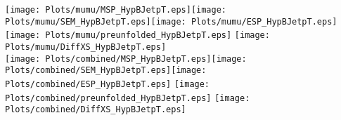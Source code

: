 \documentclass[a4paper,10pt]{article}
\begin{document}
\texttt{[image: Plots/mumu/MSP\_HypBJetpT.eps]}\texttt{[image: Plots/mumu/SEM\_HypBJetpT.eps]}\texttt{[image: Plots/mumu/ESP\_HypBJetpT.eps]} \texttt{[image: Plots/mumu/preunfolded\_HypBJetpT.eps]} \texttt{[image: Plots/mumu/DiffXS\_HypBJetpT.eps]}\\
\texttt{[image: Plots/combined/MSP\_HypBJetpT.eps]}\texttt{[image: Plots/combined/SEM\_HypBJetpT.eps]}\texttt{[image: Plots/combined/ESP\_HypBJetpT.eps]} \texttt{[image: Plots/combined/preunfolded\_HypBJetpT.eps]} \texttt{[image: Plots/combined/DiffXS\_HypBJetpT.eps]}
\end{document}
